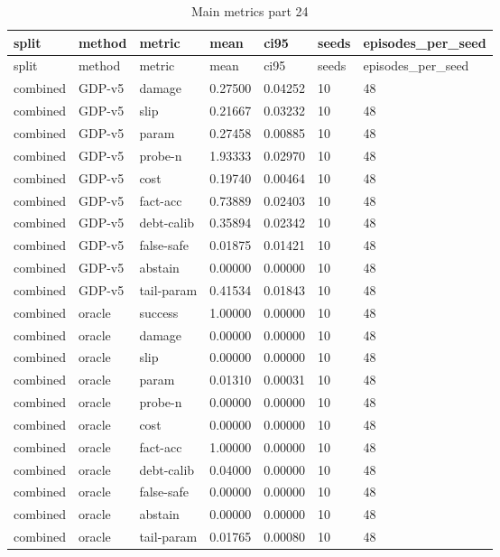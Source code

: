 \documentclass{article}
\begin{document}
\begin{center}
\tiny
\renewcommand{\arraystretch}{0.92}
\setlength{\tabcolsep}{3pt}
\begin{longtable}{lllllll}
\caption{Main metrics part 24}\label{tab:main-metrics-24}\\
\toprule
split & method & metric & mean & ci95 & seeds & episodes\_per\_seed \\
\midrule
\endfirsthead
\toprule
split & method & metric & mean & ci95 & seeds & episodes\_per\_seed \\
\midrule
\endhead
combined & GDP-v5 & damage & 0.27500 & 0.04252 & 10 & 48 \\
combined & GDP-v5 & slip & 0.21667 & 0.03232 & 10 & 48 \\
combined & GDP-v5 & param & 0.27458 & 0.00885 & 10 & 48 \\
combined & GDP-v5 & probe-n & 1.93333 & 0.02970 & 10 & 48 \\
combined & GDP-v5 & cost & 0.19740 & 0.00464 & 10 & 48 \\
combined & GDP-v5 & fact-acc & 0.73889 & 0.02403 & 10 & 48 \\
combined & GDP-v5 & debt-calib & 0.35894 & 0.02342 & 10 & 48 \\
combined & GDP-v5 & false-safe & 0.01875 & 0.01421 & 10 & 48 \\
combined & GDP-v5 & abstain & 0.00000 & 0.00000 & 10 & 48 \\
combined & GDP-v5 & tail-param & 0.41534 & 0.01843 & 10 & 48 \\
combined & oracle & success & 1.00000 & 0.00000 & 10 & 48 \\
combined & oracle & damage & 0.00000 & 0.00000 & 10 & 48 \\
combined & oracle & slip & 0.00000 & 0.00000 & 10 & 48 \\
combined & oracle & param & 0.01310 & 0.00031 & 10 & 48 \\
combined & oracle & probe-n & 0.00000 & 0.00000 & 10 & 48 \\
combined & oracle & cost & 0.00000 & 0.00000 & 10 & 48 \\
combined & oracle & fact-acc & 1.00000 & 0.00000 & 10 & 48 \\
combined & oracle & debt-calib & 0.04000 & 0.00000 & 10 & 48 \\
combined & oracle & false-safe & 0.00000 & 0.00000 & 10 & 48 \\
combined & oracle & abstain & 0.00000 & 0.00000 & 10 & 48 \\
combined & oracle & tail-param & 0.01765 & 0.00080 & 10 & 48 \\

\end{longtable}
\end{center}
\end{document}
